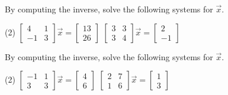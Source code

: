 \documentclass{ximera}
\begin{document}
\begin{exercise}
    By computing the inverse, solve the following systems for $\vec{x}$.
    \begin{tasks}(2)
        \task
        $\begin{bmatrix}
            4 & 1 \\
            -1 & 3
        \end{bmatrix} \vec{x} =
        \begin{bmatrix} 13 \\ 26 \end{bmatrix}$
        \task
        $\begin{bmatrix}
            3 & 3 \\
            3 & 4
        \end{bmatrix} \vec{x} =
        \begin{bmatrix} 2 \\ -1 \end{bmatrix}$
    \end{tasks}
\end{exercise}

\begin{exercise}%
    By computing the inverse, solve the following systems for $\vec{x}$.
    \begin{tasks}(2)
        \task
        $\begin{bmatrix}
            -1 & 1 \\
            3 & 3
        \end{bmatrix} \vec{x} =
        \begin{bmatrix} 4 \\ 6 \end{bmatrix}$
        \task
        $\begin{bmatrix}
            2 & 7 \\
            1 & 6
        \end{bmatrix} \vec{x} =
        \begin{bmatrix} 1 \\ 3 \end{bmatrix}$
    \end{tasks}
\end{exercise}
\end{document}
